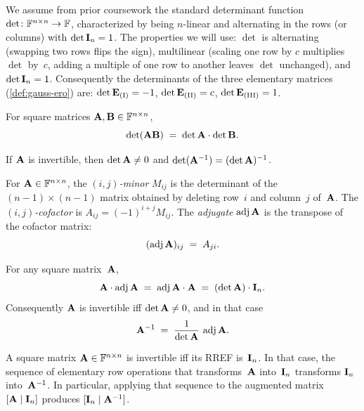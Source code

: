 We assume from prior coursework the standard determinant function
$\det\colon \mathbb{F}^{n \times n} \to \mathbb{F}$, characterized by being $n$-linear
and alternating in the rows (or columns) with $\det \mathbf{I}_n = 1$.
The properties we will use: $\det$ is alternating (swapping two rows
flips the sign), multilinear (scaling one row by $c$ multiplies $\det$
by~$c$, adding a multiple of one row to another leaves $\det$
unchanged), and $\det \mathbf{I}_n = 1$. Consequently the determinants of
the three elementary matrices (\cref{def:gauss-ero}) are:
$\det \mathbf{E}_{\text{(I)}} = -1$, $\det \mathbf{E}_{\text{(II)}} = c$,
$\det \mathbf{E}_{\text{(III)}} = 1$.

\begin{theorem}
\label{thm:det-product}
For square matrices $\mathbf{A}, \mathbf{B} \in \mathbb{F}^{n \times n}$,
\[
  \det(\mathbf{A}\mathbf{B}) \;=\; \det \mathbf{A} \cdot \det \mathbf{B}.
\]
\end{theorem}

\begin{corollary}
\label{cor:det-inverse}
If $\mathbf{A}$ is invertible, then $\det \mathbf{A} \neq 0$ and
$\det(\mathbf{A}^{-1}) = (\det \mathbf{A})^{-1}$.
\end{corollary}

\begin{definition}
\label{def:adjugate}
For $\mathbf{A} \in \mathbb{F}^{n \times n}$, the \emph{$(i, j)$-minor} $M_{ij}$
is the determinant of the $(n-1) \times (n-1)$ matrix obtained by
deleting row~$i$ and column~$j$ of~$\mathbf{A}$. The
\emph{$(i, j)$-cofactor} is $A_{ij} = (-1)^{i+j} M_{ij}$. The
\emph{adjugate} $\operatorname{adj} \mathbf{A}$ is the transpose of the cofactor
matrix:
\[
  (\operatorname{adj} \mathbf{A})_{ij} \;=\; A_{ji}.
\]
\end{definition}

\begin{theorem}
\label{thm:cofactor-inverse}
For any square matrix~$\mathbf{A}$,
\[
  \mathbf{A} \cdot \operatorname{adj} \mathbf{A} \;=\; \operatorname{adj} \mathbf{A} \cdot \mathbf{A}
  \;=\; (\det \mathbf{A}) \cdot \mathbf{I}_n.
\]
Consequently $\mathbf{A}$ is invertible iff $\det \mathbf{A} \neq 0$, and in
that case
\[
  \mathbf{A}^{-1} \;=\; \frac{1}{\det \mathbf{A}}\,\operatorname{adj} \mathbf{A}.
\]
\end{theorem}

\begin{theorem}
\label{thm:ero-inverse}
A square matrix $\mathbf{A} \in \mathbb{F}^{n \times n}$ is invertible iff its
RREF is~$\mathbf{I}_n$. In that case, the sequence of elementary row
operations that transforms~$\mathbf{A}$ into~$\mathbf{I}_n$ transforms
$\mathbf{I}_n$ into~$\mathbf{A}^{-1}$. In particular, applying that sequence
to the augmented matrix $[\mathbf{A} \mid \mathbf{I}_n]$ produces
$[\mathbf{I}_n \mid \mathbf{A}^{-1}]$.
\end{theorem}


